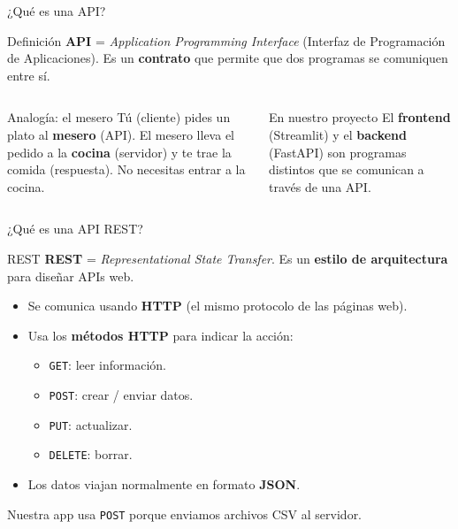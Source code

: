 \documentclass[10pt,aspectratio=169]{beamer}
\begin{document}
\begin{frame}{¿Qué es una API?}
  \begin{block}{Definición}
    \textbf{API} = \textit{Application Programming Interface} (Interfaz de
    Programación de Aplicaciones). Es un \textbf{contrato} que permite que dos
    programas se comuniquen entre sí.
  \end{block}

  \pause

  \begin{columns}
    \begin{exampleblock}{Analogía: el mesero}
      Tú (cliente) pides un plato al \textbf{mesero} (API). El mesero lleva el
      pedido a la \textbf{cocina} (servidor) y te trae la comida (respuesta).
      No necesitas entrar a la cocina.
    \end{exampleblock}

    \begin{block}{En nuestro proyecto}
      El \textbf{frontend} (Streamlit) y el \textbf{backend} (FastAPI) son
      programas distintos que se comunican a través de una API.
    \end{block}
  \end{columns}
\end{frame}

\begin{frame}{¿Qué es una API REST?}
  \begin{block}{REST}
    \textbf{REST} = \textit{Representational State Transfer}. Es un
    \textbf{estilo de arquitectura} para diseñar APIs web.
  \end{block}

  \pause

  \begin{itemize}
    \item Se comunica usando \textbf{HTTP} (el mismo protocolo de las páginas web).
    \item Usa los \textbf{métodos HTTP} para indicar la acción:
      \begin{itemize}
        \item \texttt{GET}: leer información.
        \item \texttt{POST}: crear / enviar datos.
        \item \texttt{PUT}: actualizar.
        \item \texttt{DELETE}: borrar.
      \end{itemize}
    \item Los datos viajan normalmente en formato \textbf{JSON}.
  \end{itemize}

  \pause
  \begin{center}
    \small Nuestra app usa \texttt{POST} porque enviamos archivos CSV al servidor.
  \end{center}
\end{frame}
\end{document}
